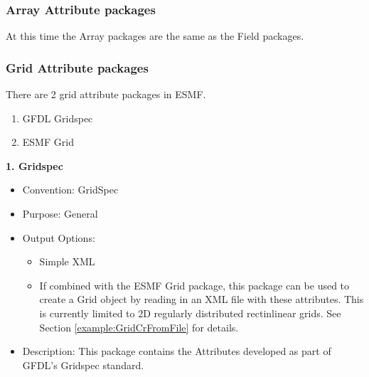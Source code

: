 \vspace{.20in}

\subsubsection{Array Attribute packages}
\label{ArrayAttributePackages}

At this time the Array packages are the same as the Field packages.

\vspace{.20in}

\subsubsection{Grid Attribute packages}
\label{GridAttributePackages}

There are 2 grid attribute packages in ESMF. 

\begin{enumerate}
    \item GFDL Gridspec
    \item ESMF Grid
\end{enumerate}

\vspace{.20in}

{\bf 1. Gridspec}

\label{CIMGridAttributePackage}

\begin{itemize}
    \item Convention: GridSpec
    \item Purpose: General
    \item Output Options:
    \begin{itemize}
        \item Simple XML
        \item If combined with the ESMF Grid package, this package can be used to create a Grid object by reading in an XML file with these attributes. This is currently limited to 2D regularly distributed rectinlinear grids. See Section \ref{example:GridCrFromFile} for details. 
    \end{itemize}
    \item Description: This package contains the Attributes developed as part of GFDL's Gridspec standard.
\end{itemize}

